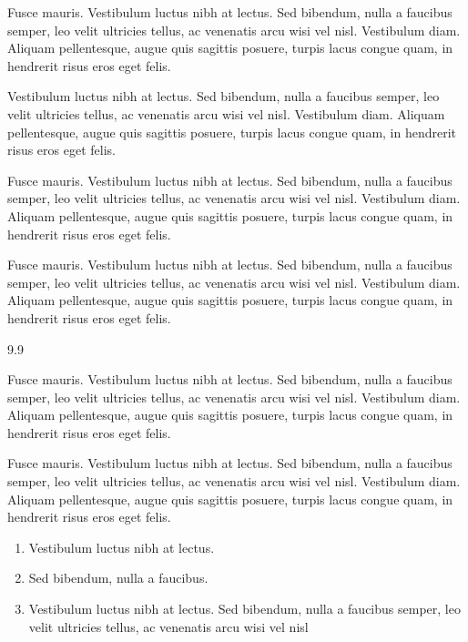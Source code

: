 \lipsum[5]
\begin{description}
\item{}
Fusce mauris. Vestibulum luctus nibh at lectus. Sed bibendum, nulla a faucibus
semper, leo velit ultricies tellus, ac venenatis arcu wisi vel nisl. Vestibulum diam. Aliquam pellentesque,
augue quis sagittis posuere, turpis lacus congue quam, in hendrerit risus eros eget felis.
\item{}
Vestibulum luctus nibh at lectus. Sed bibendum, nulla a faucibus
semper, leo velit ultricies tellus, ac venenatis arcu wisi vel nisl. Vestibulum diam. Aliquam pellentesque,
augue quis sagittis posuere, turpis lacus congue quam, in hendrerit risus eros eget felis.
\item{}
Fusce mauris. Vestibulum luctus nibh at lectus. Sed bibendum, nulla a faucibus
semper, leo velit ultricies tellus, ac venenatis arcu wisi vel nisl. Vestibulum diam. Aliquam pellentesque,
augue quis sagittis posuere, turpis lacus congue quam, in hendrerit risus eros eget felis.
\item{}
Fusce mauris. Vestibulum luctus nibh at lectus. Sed bibendum, nulla a faucibus
semper, leo velit ultricies tellus, ac venenatis arcu wisi vel nisl. Vestibulum diam. Aliquam pellentesque,
augue quis sagittis posuere, turpis lacus congue quam, in hendrerit risus eros eget felis.
\end{description}

\lipsum[5]


\begin{exerciselist}{9.9}
\item Fusce mauris. Vestibulum luctus nibh at lectus. Sed bibendum, nulla a faucibus
semper, leo velit ultricies tellus, ac venenatis arcu wisi vel nisl. Vestibulum diam. Aliquam pellentesque,
augue quis sagittis posuere, turpis lacus congue quam, in hendrerit risus eros eget felis.

\item \label{ch01:exer3.3} Fusce mauris. Vestibulum luctus nibh at lectus. Sed bibendum, nulla a faucibus
semper, leo velit ultricies tellus, ac venenatis arcu wisi vel nisl. Vestibulum diam. Aliquam pellentesque,
augue quis sagittis posuere, turpis lacus congue quam, in hendrerit risus eros eget felis.

\begin{enumerate}[(3)]
\item[(1)] Vestibulum luctus nibh at lectus.

\item[(2)] Sed bibendum, nulla a faucibus.

\item[(3)] Vestibulum luctus nibh at lectus. Sed bibendum, nulla a faucibus
semper, leo velit ultricies tellus, ac venenatis arcu wisi vel nisl
\end{enumerate}

\end{exerciselist}
